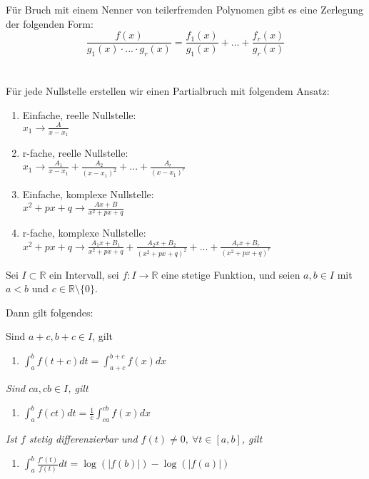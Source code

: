 \begin{theorem}[Partialbruchzerlegung]
Für Bruch mit einem Nenner von teilerfremden Polynomen gibt es eine Zerlegung der folgenden Form:
$$\frac{f(x)}{g_1(x) \cdot...\cdot g_r(x)} = \frac{f_1(x)}{g_1(x)}+ ... + \frac{f_r(x)}{g_r(x)}$$
\\\\
Für jede Nullstelle erstellen wir einen Partialbruch mit folgendem Ansatz:
\begin{enumerate}
\item Einfache, reelle Nullstelle:\\
		$x_1 \rightarrow \frac{A}{x-x_1}$
\item r-fache, reelle Nullstelle:\\
		$x_1 \rightarrow \frac{A_1}{x-x_1} + \frac{A_2}{(x-x_1)^2} + ... + \frac{A_r}{(x-x_1)^r}$
\item Einfache, komplexe Nullstelle:\\
		$x^2 + px + q \rightarrow \frac{Ax + B}{x^2+px+q}$
\item r-fache, komplexe Nullstelle:\\
		$x^2 + px + q \rightarrow \frac{A_1x + B_1}{x^2+px+q} + \frac{A_2x + B_2}{(x^2+px+q)^2} + ... + \frac{A_rx + B_r}{(x^2+px+q)^r}$
\end{enumerate}
\end{theorem}

\begin{corollary}
Sei $I\subset \mathbb{R}$ ein Intervall, sei $f:I\rightarrow \mathbb{R}$ eine stetige Funktion, und seien $a,b \in I$ mit $a<b$ und $c\in \mathbb{R}\setminus\{0\}$.

Dann gilt folgendes:

Sind $a+c,b+c \in I$, gilt
	\begin{enumerate}
		\item $\int_{a}^{b}f(t+c)dt = \int_{a+c}^{b+c}f(x)dx$
	\end{enumerate}
	
	\textit{Sind $ca,cb \in I$, gilt}
	\begin{enumerate}[resume]
		\item $\int_{a}^{b}f(ct)dt = \frac{1}{c}\int_{ca}^{cb}f(x)dx$
	\end{enumerate}	

	\textit{Ist $f$ stetig differenzierbar und $f(t) \neq 0,\ \forall t \in [a,b]$, gilt}
	\begin{enumerate}[resume]
	\item $\int_{a}^{b}\frac{f'(t)}{f(t)}dt = \log(|f(b)|)- \log(|f(a)|)$
	\end{enumerate}	
\end{corollary}


